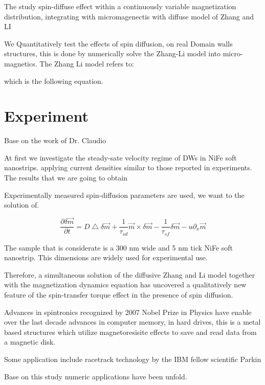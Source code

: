 The study spin-diffuse effect within a continuously variable magnetization distribution, integrating with micromagenectis with diffuse model of Zhang and LI \cite{claudio}

We Quantitatively test the effects of spin diffusion, on real Domain walls structures, this is done by numerically solve the Zhang-Li model \cite{zhang} into micro-magnetics.
The Zhang Li model refers to:

which is the following equation.



\section{Experiment}

Base on the work of Dr. Claudio \cite{claudio}

At first we investigate the steady-sate velocity regime of DWs in NiFe soft nanostrips. applying current densities similar to those reported in experiments. The results that we are going to obtain

Experimentally measured spin-diffusion parameters are used, we want to the solution of.

\begin{equation}
 \frac{\partial \delta \vec{m} }{\partial t} =  D\bigtriangleup \delta \vec{m} + \frac{1}{\tau_{sd}} \vec{m} \times \delta  \vec{m} - \frac{1}{\tau_{sf}}\delta \vec{m} - u \partial_{x}  \vec{m}
\end{equation}

The sample that is considerate is a 300 nm wide and 5 nm tick NiFe soft nanostrip. This dimensions are widely used for experimental use.

Therefore, a simultaneous solution of the diffusive Zhang and Li model together with the magnetization dynamics equation has uncovered a qualitatively new feature of the spin-transfer torque effect in the presence of spin diffusion.


Advances in spintronics recognized by 2007 Nobel Prize in Physics have enable over the last decade advances in computer memory, in hard drives, this is a metal based structures which utilize magnetoresisite effects to save and read data from a magnetic disk. \cite{handbookspin}

Some application include racetrack technology by the IBM fellow scientific Parkin \cite{racetrack}

Base on this study numeric applications have been unfold.


